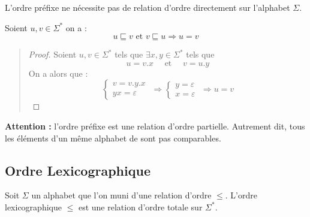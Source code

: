 \begin{remark}
    L'ordre préfixe ne nécessite pas de relation d'ordre directement sur l'alphabet $\Sigma$. 
\end{remark}

\begin{prop}
    Soient $u,v \in \Sigma^*$ on a : 
        \[ u \sqsubseteq v \text{ et } v \sqsubseteq u \Longrightarrow u = v \] 
\end{prop}

\begin{quote}
    \begin{footnotesize}
        \begin{proof}
            Soient $u,v \in \Sigma^*$ tels que $ \exists x,y \in \Sigma^*$ tels que 
                \[ u = v.x \quad \text{ et } \quad v = u.y \] 
            On a alors que :
                \[
                    \begin{cases}
                        v = v.y.x \\ 
                        yx = \varepsilon 
                    \end{cases}
                    \; \Longrightarrow 
                    \begin{cases}
                        y = \varepsilon \\ 
                        x = \varepsilon 
                    \end{cases}
                    \; \Longrightarrow u = v 
                \]
        \end{proof}
    \end{footnotesize}
\end{quote}

\begin{remark}
    \textbf{Attention : } l'ordre préfixe est une relation d'ordre partielle. 
    Autrement dit, tous les éléments d'un même alphabet de sont pas comparables. 
\end{remark}

\subsection{Ordre Lexicographique}

\begin{definition}
    Soit $\Sigma$ un alphabet que l'on muni d'une relation d'ordre $\leqslant$. 
    L'ordre lexicographique $\leqslant$ est une relation d'ordre totale sur $\Sigma^*$. 
\end{definition}

